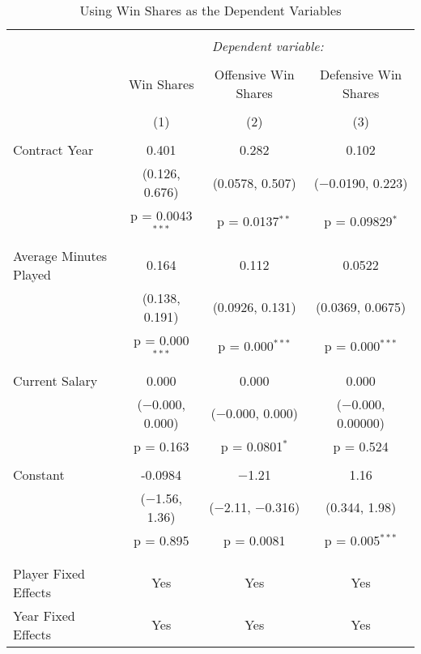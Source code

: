 \documentclass[12pt]{article}
\begin{document}
	
	\begin{landscape}
		\begin{table}[!htbp] \centering 
			\caption{Using Win Shares as the Dependent Variables} 
			\label{geewinshare} 
			\begin{tabular}{@{\extracolsep{5pt}}lccc} 
				\\[-1.8ex]\hline 
				\hline \\[-1.8ex] 
				& \multicolumn{3}{c}{\textit{Dependent variable:}} \\ 
				\cline{2-4} 
				\\[-1.8ex] & Win Shares & Offensive Win Shares & Defensive Win Shares \\ 
				\\[-1.8ex] & (1) & (2) & (3)\\ 
				\hline \\[-1.8ex] 
				Contract Year & 0.401 & 0.282 & 0.102 \\ 
				& (0.126, 0.676) & (0.0578, 0.507) & ($-$0.0190, 0.223) \\ 
				& p = 0.0043$^{***}$ & p = 0.0137$^{**}$ & p = 0.09829$^{*}$ \\ 
				& & & \\ 
				Average Minutes Played & 0.164 & 0.112 & 0.0522 \\ 
				& (0.138, 0.191) & (0.0926, 0.131) & (0.0369, 0.0675) \\ 
				& p = 0.000$^{***}$ & p = 0.000$^{***}$ & p = 0.000$^{***}$ \\ 
				& & & \\ 
				Current Salary & 0.000 & 0.000 & 0.000 \\ 
				& ($-$0.000, 0.000) & ($-$0.000, 0.000) & ($-$0.000, 0.00000) \\ 
				& p = 0.163 & p = 0.0801$^{*}$ & p = 0.524 \\ 
				& & & \\ 
				Constant & -0.0984 & $-$1.21 & 1.16 \\ 
				& ($-$1.56, 1.36) & ($-$2.11, $-$0.316) & (0.344, 1.98) \\ 
				& p = 0.895 & p = 0.0081 & p = 0.005$^{***}$ \\ 
				& & & \\ 
				\hline \\[-1.8ex] 
				Player Fixed Effects & Yes & Yes & Yes \\ 
				Year Fixed Effects & Yes & Yes & Yes \\ 

\end{tabular}
\end{table}
\end{landscape}
\end{document}

